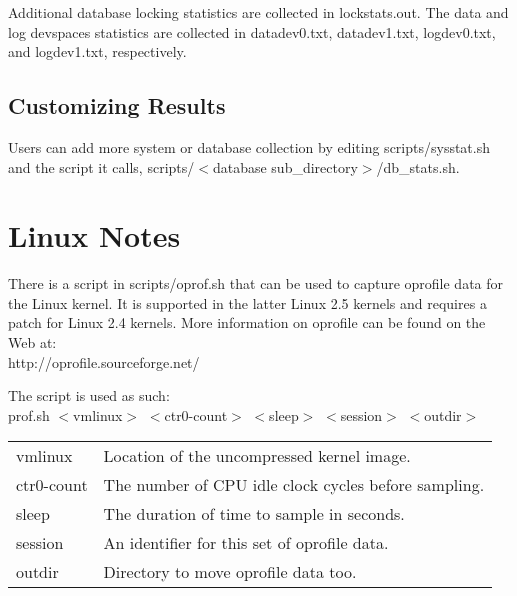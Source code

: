\documentclass{article}
\begin{document}
\noindent
Additional database locking statistics are collected in lockstats.out.  The
data and log devspaces statistics are collected in datadev0.txt, datadev1.txt,
logdev0.txt, and logdev1.txt, respectively.

\subsection{Customizing Results}

Users can add more system or database collection by editing scripts/sysstat.sh
and the script it calls,  scripts/$<$database sub\_directory$>$/db\_stats.sh.

\section{Linux Notes}

There is a script in scripts/oprof.sh that can be used to capture oprofile
data for the Linux kernel.  It is supported in the latter Linux 2.5 kernels
and requires a patch for Linux 2.4 kernels.  More information on oprofile can
be found on the Web at: \\
\indent http://oprofile.sourceforge.net/

\noindent
The script is used as such: \\
\indent prof.sh $<$vmlinux$>$ $<$ctr0-count$>$ $<$sleep$>$ $<$session$>$ $<$outdir$>$

\begin{tabular}[c]{ll}
vmlinux		& Location of the uncompressed kernel image. \\
ctr0-count	& The number of CPU idle clock cycles before sampling. \\
sleep		& The duration of time to sample in seconds. \\
session		& An identifier for this set of oprofile data. \\
outdir		& Directory to move oprofile data too. \\
\end{tabular}
\end{document}
